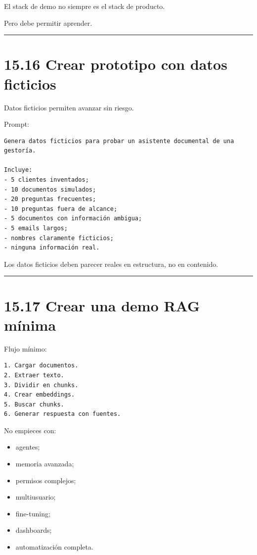 El stack de demo no siempre es el stack de producto.

Pero debe permitir aprender.

\begin{center}\rule{0.5\linewidth}{0.5pt}\end{center}

\section{15.16 Crear prototipo con datos
ficticios}\label{crear-prototipo-con-datos-ficticios}

Datos ficticios permiten avanzar sin riesgo.

Prompt:

\begin{lstlisting}
Genera datos ficticios para probar un asistente documental de una gestoría.

Incluye:
- 5 clientes inventados;
- 10 documentos simulados;
- 20 preguntas frecuentes;
- 10 preguntas fuera de alcance;
- 5 documentos con información ambigua;
- 5 emails largos;
- nombres claramente ficticios;
- ninguna información real.
\end{lstlisting}

Los datos ficticios deben parecer reales en estructura, no en contenido.

\begin{center}\rule{0.5\linewidth}{0.5pt}\end{center}

\section{15.17 Crear una demo RAG
mínima}\label{crear-una-demo-rag-muxednima}

Flujo mínimo:

\begin{lstlisting}
1. Cargar documentos.
2. Extraer texto.
3. Dividir en chunks.
4. Crear embeddings.
5. Buscar chunks.
6. Generar respuesta con fuentes.
\end{lstlisting}

No empieces con:

\begin{itemize}
\tightlist
\item
  agentes;
\item
  memoria avanzada;
\item
  permisos complejos;
\item
  multiusuario;
\item
  fine-tuning;
\item
  dashboards;
\item
  automatización completa.
\end{itemize}

